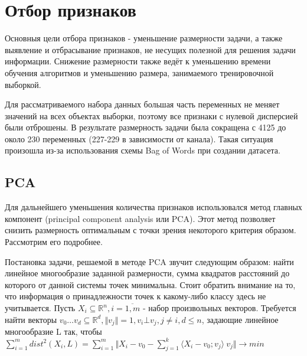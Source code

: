 \section{Отбор признаков}

\begin{Отбор признаков}
Основныя цели отбора признаков - уменьшение размерности задачи, а также выявление и отбрасывание признаков,
 не несущих полезной для решения задачи информации. Снижение размерности также ведёт к уменьшению времени обучения алгоритмов и уменьшению размера, занимаемого тренировочной выборкой.
 \par
Для рассматриваемого набора данных большая часть переменных не меняет значений на всех объектах выборки,
 поэтому все признаки с нулевой дисперсией были отброшены. В результате размерность задачи была сокращена
 с 4125 до около 230 переменных (227-229 в зависимости от канала). Такая ситуация произошла из-за использования схемы Bag of Words при создании датасета. 
 \subsection{PCA}
 \begin{PCA}
 Для дальнейшего уменьшения количества признаков использовался метод главных компонент
 (principal component analysis или PCA). Этот метод позволяет снизить размерность оптимальным с точки зрения некоторого критерия образом. Рассмотрим его подробнее.
 \par
 Постановка задачи, решаемой в методе PCA звучит следующим образом: найти линейное многообразие заданной 
 размерности, сумма квадратов расстояний до которого от данной системы точек минимальна. Стоит обратить внимание на то, что информация о принадлежности точек к какому-либо классу здесь не учитывается.
 Пусть \( X_i \subseteq \mathbb{R}^n, i=\overline{1,m} \) - набор произвольных векторов. Требуется найти векторы \(v_0\ldots v_d\subseteq \mathbb{R}^d, \Vert v_j \Vert = 1, v_i \bot v_j, j \neq  i, d \leq n\), задающие линейное многообразие L так, чтобы \(
 \sum_{i=1}^{m} dist^2(X_i, L) = \sum_{i=1}^{m}\Vert X_i - v_0 - \sum_{j=1}^k\langle X_i - v_0; v_j\rangle\ v_j \Vert\rightarrow min\)
 
 
 

\end{PCA}
\end{Отбор признаков}
